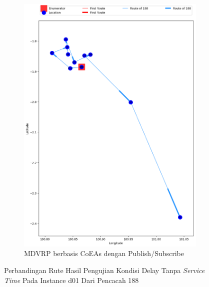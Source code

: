 \begin{figure}[H]\ContinuedFloat
	\centering
	\begin{subfigure}[t]{\textwidth}
		\centering
		\includegraphics[width=\textwidth]{Resources/Images/delayed_1/real_m15_n100_delayed_1_188_pubsub_coes}
		\caption{MDVRP berbasis CoEAs dengan Publish/Subscribe}
		\label{fig:real_m15_n100_delayed_1_188_pubsub_coes}
	\end{subfigure}
	\caption{Perbandingan Rute Hasil Pengujian Kondisi Delay Tanpa \textit{Service Time} Pada Instance d01 Dari Pencacah 188}
	\label{fig:real_m15_n100_delayed_1_188_contd}
\end{figure}


